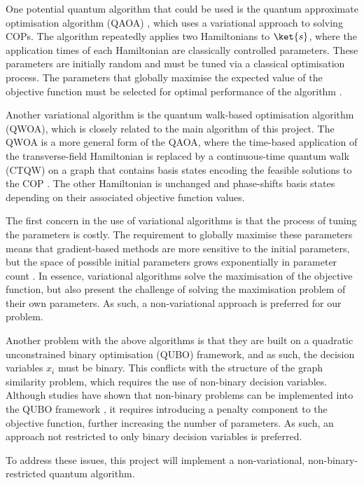 One potential quantum algorithm that could be used is the quantum approximate optimisation algorithm (QAOA) \cite{QAOA}, which uses a variational approach to solving COPs. The algorithm repeatedly applies two Hamiltonians to $\ket{s}$, where the application times of each Hamiltonian are classically controlled parameters. These parameters are initially random and must be tuned via a classical optimisation process. The parameters that globally maximise the expected value of the objective function must be selected for optimal performance of the algorithm \cite{QAOA-review}.

Another variational algorithm is the quantum walk-based optimisation algorithm (QWOA), which is closely related to the main algorithm of this project. The QWOA is a more general form of the QAOA, where the time-based application of the transverse-field Hamiltonian is replaced by a continuous-time quantum walk (CTQW) on a graph that contains basis states encoding the feasible solutions to the COP \cite{QWOA}. The other Hamiltonian is unchanged and phase-shifts basis states depending on their associated objective function values.

The first concern in the use of variational algorithms is that the process of tuning the parameters is costly. The requirement to globally maximise these parameters means that gradient-based methods are more sensitive to the initial parameters, but the space of possible initial parameters grows exponentially in parameter count \cite{QAOA-optimiser}. In essence, variational algorithms solve the maximisation of the objective function, but also present the challenge of solving the maximisation problem of their own parameters. As such, a non-variational approach is preferred for our problem.

Another problem with the above algorithms is that they are built on a quadratic unconstrained binary optimisation (QUBO) framework, and as such, the decision variables $x_{i}$ must be binary. This conflicts with the structure of the graph similarity problem, which requires the use of non-binary decision variables. Although studies have shown that non-binary problems can be implemented into the QUBO framework \cite{QUBO-traveling}, it requires introducing a penalty component to the objective function, further increasing the number of parameters.  As such, an approach not restricted to only binary decision variables is preferred.

To address these issues, this project will implement a non-variational, non-binary-restricted quantum algorithm.

